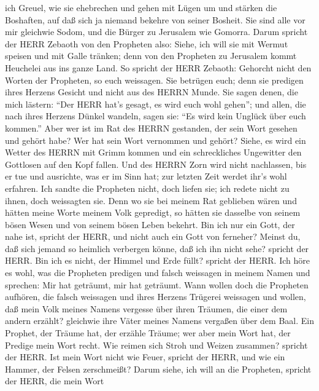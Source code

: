ich Greuel, wie sie ehebrechen und gehen mit Lügen um und stärken die
Boshaften, auf daß sich ja niemand bekehre von seiner Bosheit. Sie sind
alle vor mir gleichwie Sodom, und die Bürger zu Jerusalem wie Gomorra.
 Darum spricht der HERR Zebaoth von den Propheten also:
Siehe, ich will sie mit Wermut speisen und mit Galle tränken; denn von
den Propheten zu Jerusalem kommt Heuchelei aus ins ganze Land.
 So spricht der HERR Zebaoth: Gehorcht nicht den Worten der
Propheten, so euch weissagen. Sie betrügen euch; denn sie predigen ihres
Herzens Gesicht und nicht aus des HERRN Munde.  Sie sagen
denen, die mich lästern: ``Der HERR hat's gesagt, es wird euch wohl
gehen''; und allen, die nach ihres Herzens Dünkel wandeln, sagen sie:
``Es wird kein Unglück über euch kommen.''  Aber wer ist im
Rat des HERRN gestanden, der sein Wort gesehen und gehört habe? Wer hat
sein Wort vernommen und gehört?  Siehe, es wird ein Wetter
des HERRN mit Grimm kommen und ein schreckliches Ungewitter den
Gottlosen auf den Kopf fallen.  Und des HERRN Zorn wird
nicht nachlassen, bis er tue und ausrichte, was er im Sinn hat; zur
letzten Zeit werdet ihr's wohl erfahren.  Ich sandte die
Propheten nicht, doch liefen sie; ich redete nicht zu ihnen, doch
weissagten sie.  Denn wo sie bei meinem Rat geblieben wären
und hätten meine Worte meinem Volk gepredigt, so hätten sie dasselbe von
seinem bösen Wesen und von seinem bösen Leben bekehrt.  Bin
ich nur ein Gott, der nahe ist, spricht der HERR, und nicht auch ein
Gott von ferneher?  Meinst du, daß sich jemand so heimlich
verbergen könne, daß ich ihn nicht sehe? spricht der HERR. Bin ich es
nicht, der Himmel und Erde füllt? spricht der HERR.  Ich
höre es wohl, was die Propheten predigen und falsch weissagen in meinem
Namen und sprechen: Mir hat geträumt, mir hat geträumt. 
Wann wollen doch die Propheten aufhören, die falsch weissagen und ihres
Herzens Trügerei weissagen  und wollen, daß mein Volk
meines Namens vergesse über ihren Träumen, die einer dem andern erzählt?
gleichwie ihre Väter meines Namens vergaßen über dem Baal. 
Ein Prophet, der Träume hat, der erzähle Träume; wer aber mein Wort hat,
der Predige mein Wort recht. Wie reimen sich Stroh und Weizen zusammen?
spricht der HERR.  Ist mein Wort nicht wie Feuer, spricht
der HERR, und wie ein Hammer, der Felsen zerschmeißt? 
Darum siehe, ich will an die Propheten, spricht der HERR, die mein Wort
